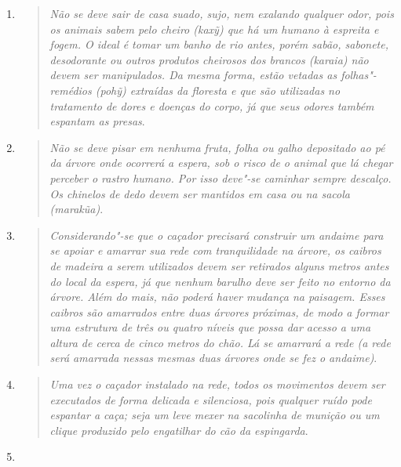 \begin{enumerate}
\def\labelenumi{\arabic{enumi}.}
\item
\begin{quote}
  \emph{Não se deve sair de casa suado, sujo, nem exalando qualquer odor, pois
    os animais sabem pelo cheiro (\emph{kaxỹ}) que há um humano à espreita
    e fogem. O ideal é tomar um banho de rio antes, porém sabão, sabonete,
    desodorante ou outros produtos cheirosos dos brancos (\emph{karaia})
    não devem ser manipulados. Da mesma forma, estão vetadas as
    folhas"-remédios (\emph{pohỹ}) extraídas da floresta e que são
    utilizadas no tratamento de dores e doenças do corpo, já que seus
    odores também espantam as presas}.
    \end{quote}
\item
\begin{quote}
  \emph{Não se deve pisar em nenhuma fruta, folha ou galho depositado ao pé da
    árvore onde ocorrerá a espera, sob o risco de o animal que lá chegar
    perceber o rastro humano. Por isso deve"-se caminhar sempre descalço.
    Os chinelos de dedo devem ser mantidos em casa ou na sacola
    (\emph{marakũa})}.
    \end{quote}
\item
\begin{quote}
  \emph{Considerando"-se que o caçador precisará construir um andaime para se
    \emph{apoiar} e amarrar sua rede com tranquilidade na árvore, os
    caibros de madeira a serem utilizados devem ser retirados alguns
    metros antes do local da espera, já que nenhum barulho deve ser feito
    no entorno da árvore. Além do mais, não poderá haver mudança na
    paisagem. Esses caibros são amarrados entre duas árvores próximas, de
    modo a formar uma estrutura de três ou quatro níveis que possa dar
    acesso a uma altura de cerca de cinco metros do chão. Lá se amarrará a
    rede (a rede será amarrada nessas mesmas duas árvores onde se fez o
    andaime)}.
    \end{quote}
\item
\begin{quote}
  \emph{Uma vez o caçador instalado na rede, todos os movimentos devem ser
    executados de forma delicada e silenciosa, pois qualquer ruído pode
    espantar a caça; seja um leve mexer na sacolinha de munição ou um
    \emph{clique} produzido pelo engatilhar do cão da espingarda}.
    \end{quote}
\item
\begin{quote}

\end{quote}
\end{enumerate}
